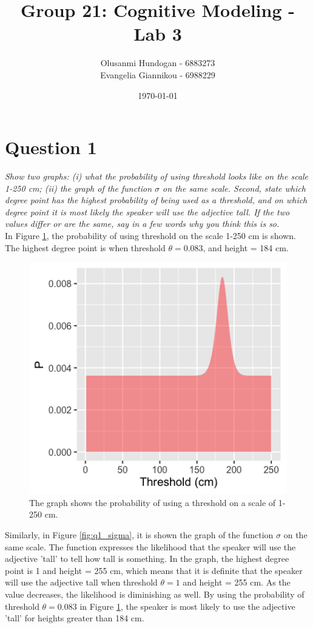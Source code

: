\documentclass[11pt,a4paper,oneside]{article}
\title{\textbf{Group 21: Cognitive Modeling - Lab 3}}
\date{\today}
\author{Olusanmi Hundogan - 6883273\\
Evangelia Giannikou - 6988229\\
}
\begin{document}
\maketitle

\section{Question 1}
\label{Q1}
\textit{Show two graphs: (i) what the probability of using threshold looks like on the scale 1-250 cm; (ii) the graph of the function $\sigma$ on the same scale. Second, state which degree point has the highest probability of being used as a threshold, and on which degree point it is most likely the speaker will use the adjective tall. If the two values differ or are the same, say in a few words why you think this is so.}\\

In Figure \ref{fig:q1_threshold}, the probability of using threshold on the scale 1-250 cm is shown. The highest degree point is when threshold $ \theta = 0.083$, and height = 184 cm.

\begin{figure}[H]
    \centering
    \includegraphics[width=\textwidth]{figs/Question_1_threshold.png}
    \caption{The graph shows the probability of using a threshold on a scale of 1-250 cm.}
  \label{fig:q1_threshold}
\end{figure}

Similarly, in Figure \ref{fig:q1_sigma}, it is shown the graph of the function $\sigma$ on the same scale. The function expresses the likelihood that the speaker will use the adjective 'tall' to tell how tall is something. In the graph, the highest degree point is 1 and height = 255 cm, which means that it is definite that the speaker will use the adjective tall when threshold $ \theta = 1$ and height = 255 cm. As the value decreases, the likelihood is diminishing as well. By using the probability of threshold $\theta = 0.083$ in Figure \ref{fig:q1_threshold}, the speaker is most likely to use the adjective 'tall' for heights greater than 184 cm.
\end{document}
